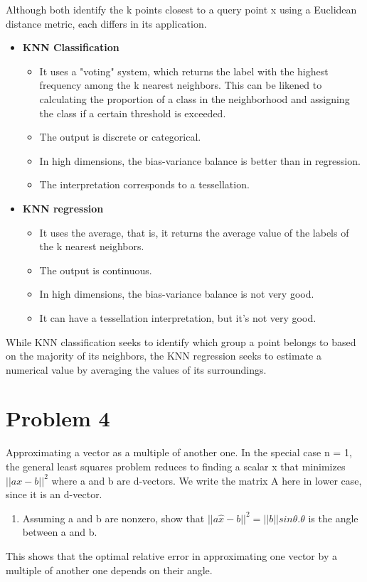 \documentclass[conference, onecolumn]{IEEEtran}
\begin{document}
	Although both identify the k points closest to a query point x using a Euclidean distance metric, each differs in its application.
	\begin{itemize}
		\item \textbf{KNN Classification}
		\begin{itemize}
			\item It uses a "voting" system, which returns the label with the highest frequency among the k nearest neighbors. This can be likened to calculating the proportion of a class in the neighborhood and assigning the class if a certain threshold is exceeded.
			\item The output is discrete or categorical.
			\item In high dimensions, the bias-variance balance is better than in regression.
			\item The interpretation corresponds to a tessellation.
		\end{itemize}
		
		\item \textbf{KNN regression}
		\begin{itemize}
			\item It uses the average, that is, it returns the average value of the labels of the k nearest neighbors.
			\item The output is continuous.
			\item In high dimensions, the bias-variance balance is not very good.
			\item It can have a tessellation interpretation, but it's not very good.
		\end{itemize}
	\end{itemize}
	While KNN classification seeks to identify which group a point belongs to based on the majority of its neighbors, the KNN regression seeks to estimate a numerical value by averaging the values of its surroundings.
	
	\section*{Problem 4}
	Approximating a vector as a multiple of another one. In the special case n = 1, the general least squares	problem reduces to finding a scalar x that minimizes $||ax-b||^2$ where a and b are d-vectors. We write the	matrix A here in lower case, since it is an d-vector.
	\begin{enumerate}
		\item[(a)] Assuming a and b are nonzero, show that $||a\hat{x} - b||^2 = ||b|| sin \theta. \theta$ is the angle between a and b.
	\end{enumerate}
	This shows that the optimal relative error in approximating one vector by a multiple of another one depends	on their angle.
\end{document}
